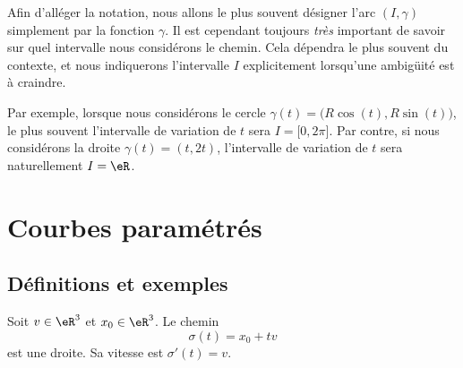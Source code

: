 \newcommand{\CaptionFigExempleArcParam}{Des exemples d'arcs paramétrées. Ceux ne sont pas des graphes.}


\begin{remark}
    Afin d'alléger la notation, nous allons le plus souvent désigner l'arc $(I,\gamma)$ simplement par la fonction $\gamma$. Il est cependant toujours \emph{très} important de savoir sur quel intervalle nous considérons le chemin. Cela dépendra le plus souvent du contexte, et nous indiquerons l'intervalle $I$ explicitement lorsqu'une ambigüité est à craindre.

    Par exemple, lorsque nous considérons le cercle $\gamma(t)=\big( R\cos(t),R\sin(t) \big)$, le plus souvent l'intervalle de variation de $t$ sera $I=\mathopen[ 0 , 2\pi \mathclose]$. Par contre, si nous considérons la droite $\gamma(t)=(t,2t)$, l'intervalle de variation de $t$ sera naturellement $I=\eR$.
\end{remark}

\section{Courbes paramétrés}

\subsection{Définitions et exemples}

\begin{example}
    Soit $v\in\eR^3$ et $x_0\in\eR^3$. Le chemin
    \begin{equation}
        \sigma(t)=x_0+tv
    \end{equation}
    est une droite. Sa vitesse est $\sigma'(t)=v$.    
\end{example}

